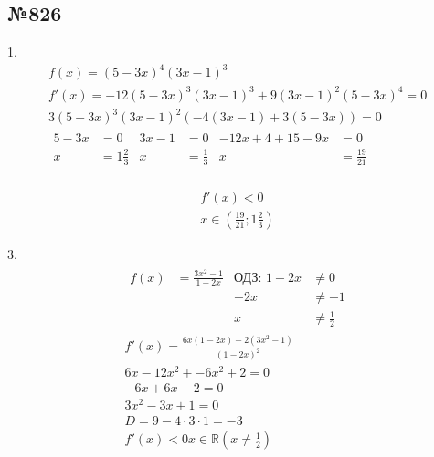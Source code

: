 \documentclass[12pt]{article}
\begin{document}
\subsection*{№826}
1.
\begin{gather*}
    f(x)=(5-3x)^4(3x-1)^3\\
    f'(x)=-12(5-3x)^3(3x-1)^3+9(3x-1)^2(5-3x)^4=0\\
    3(5-3x)^3 (3x-1)^2 (-4(3x-1)+3(5-3x))=0\\
    \begin{aligned}
        5-3x & =0            & 3x-1 & =0           & -12x+4+15-9x & =0             \\
        x    & =1\frac{2}{3} & x    & =\frac{1}{3} & x            & =\frac{19}{21} \\
    \end{aligned}
\end{gather*}
\begin{figure}[!h]
    \centering
\end{figure}
\begin{gather*}
    f'(x) <0 \\
    x \in (\frac{19}{21};1\frac{2}{3})
\end{gather*}

3.
\begin{gather*}
    \begin{aligned}
        f(x) & =\frac{3x^2 -1}{1-2x} & \text{ОДЗ: }1-2x & \neq 0           \\
             &                       & -2x              & \neq -1          \\
             &                       & x                & \neq \frac{1}{2}
    \end{aligned}\\
    f'(x)=\frac{6x(1-2x)-2(3x^2 -1)}{(1-2x)^2}\\
    6x-12x^2+-6x^2+2=0\\
    -6x+6x-2=0\\
    3x^2-3x+1=0\\
    D=9-4\cdot3\cdot1=-3\\
    f'(x)<0 {} x \in \mathbb{R} (x\neq \frac{1}{2})
\end{gather*}
\begin{gather*}
\end{gather*}
\end{document}
